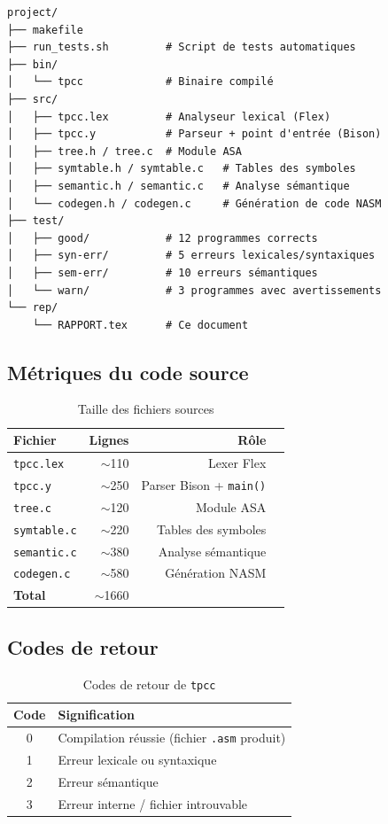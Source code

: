 \documentclass[12pt,a4paper]{article}
\newcommand{\tpcc}{\texttt{tpcc}}
\begin{document}
\begin{verbatim}
project/
├── makefile
├── run_tests.sh         # Script de tests automatiques
├── bin/
│   └── tpcc             # Binaire compilé
├── src/
│   ├── tpcc.lex         # Analyseur lexical (Flex)
│   ├── tpcc.y           # Parseur + point d'entrée (Bison)
│   ├── tree.h / tree.c  # Module ASA
│   ├── symtable.h / symtable.c   # Tables des symboles
│   ├── semantic.h / semantic.c   # Analyse sémantique
│   └── codegen.h / codegen.c     # Génération de code NASM
├── test/
│   ├── good/            # 12 programmes corrects
│   ├── syn-err/         # 5 erreurs lexicales/syntaxiques
│   ├── sem-err/         # 10 erreurs sémantiques
│   └── warn/            # 3 programmes avec avertissements
└── rep/
    └── RAPPORT.tex      # Ce document
\end{verbatim}

\subsection{Métriques du code source}

\begin{table}[H]
\centering
\begin{tabular}{lrrr}
\toprule
\textbf{Fichier} & \textbf{Lignes} & \textbf{Rôle} \\
\midrule
\texttt{tpcc.lex}      & $\sim$110 & Lexer Flex \\
\texttt{tpcc.y}        & $\sim$250 & Parser Bison + \texttt{main()} \\
\texttt{tree.c}        & $\sim$120 & Module ASA \\
\texttt{symtable.c}    & $\sim$220 & Tables des symboles \\
\texttt{semantic.c}    & $\sim$380 & Analyse sémantique \\
\texttt{codegen.c}     & $\sim$580 & Génération NASM \\
\midrule
\textbf{Total}         & $\sim$1660 & \\
\bottomrule
\end{tabular}
\caption{Taille des fichiers sources}
\end{table}

\subsection{Codes de retour}

\begin{table}[H]
\centering
\begin{tabular}{cl}
\toprule
\textbf{Code} & \textbf{Signification} \\
\midrule
0 & Compilation réussie (fichier \texttt{.asm} produit) \\
1 & Erreur lexicale ou syntaxique \\
2 & Erreur sémantique \\
3 & Erreur interne / fichier introuvable \\
\bottomrule
\end{tabular}
\caption{Codes de retour de \tpcc{}}
\end{table}
\end{document}
